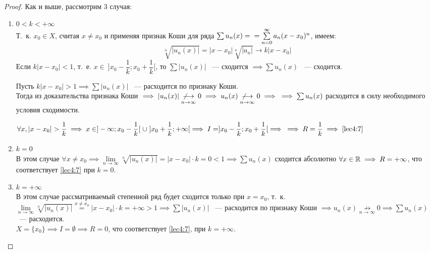 \documentclass[../../main.tex]{subfiles}
\begin{document}
\begin{proof}
	Как и выше, рассмотрим 3 случая:
	\begin{enumerate}
		\item $0 < k < +\infty$ \\
		Т.~к. $x_0 \in X$, считая $x \ne x_0$ и применяя признак Коши
		для ряда $\sum u_n(x) = \\ = \sum\limits_{n = 0}^{\infty} 
		a_n(x - x_0)^n$, имеем:
		\[ \sqrt[n]{ |u_n(x)| } = |x - x_0| \sqrt[n]{|a_n|} 
		\longrightarrow k|x - x_0|
		  \]
		 Если $k|x - x_0| < 1$, т.~е. 
		 $x \in \: ] x_0 - \dfrac{1}{k}; x_0 + \dfrac{1}{k} [$, то
		 $\sum |u_n(x)| $ ~--- сходится $\implies \sum u_n(x)$ ~--- сходится.
		 
		 Пусть $k|x - x_0| > 1 \implies \sum |u_n(x)|$ ~--- расходится
		 по признаку Коши. \\
		 Тогда из доказательства признака Коши $\implies |u_n(x)| 
		 \underset{n \to \infty}{\not \longrightarrow} 0 \implies u_n(x)
		 \underset{n \to \infty}{\not \longrightarrow} 0 \implies 
		 \\ \implies \sum u_n(x) $
		 расходится в силу необходимого условия сходимости.
		 
		 $\forall x, |x - x_0| > \dfrac{1}{k} \implies 
		 x \in ]-\infty; x_0 - \dfrac{1}{k} [ \;
		 \cup \; ] x_0 + \dfrac{1}{k}; +\infty[ 
		 \implies I = ]x_0 - \dfrac{1}{k}; x_0 + \dfrac{1}{k} [ 
		 \implies \\ \implies R = \dfrac{1}{k} \implies \eqref{lec4:7}$
		 
		 \item $k = 0$ \\
		 В этом случае $\forall x \ne x_0 \implies 
		 \underset{n \to \infty}{\lim} \sqrt[n]{|u_n(x)|} =
		 |x - x_0| \cdot k = 0 < 1 \implies \sum u_n(x)$ 
		 сходится абсолютно 
		 $\forall x \in \mathbb{R} \implies R = +\infty$, что соответствует 
		 \eqref{lec4:7} при $k = 0$.
		 
		 \item $k = +\infty$ \\
		 В этом случае рассматриваемый степенной ряд будет сходится
		 только при $x = x_0$, т.~к. $\underset{n \to \infty}{\lim}
		 \sqrt[n]{|u_n(x)|} \overset{x \ne x_0} = |x - x_0| \cdot k =
		 +\infty > 1 \implies \sum |u_n(x)| $ ~--- расходится по 
		 признаку Коши
		 $\implies u_n(x) \underset{n \to \infty}{\not \longrightarrow} 0 
		 \implies \sum u_n(x)$ ~--- расходится. \\
		 $X = \{ x_0 \} \implies I = \emptyset \implies R = 0$,
		 что соответствует \eqref{lec4:7}, при $k = +\infty$.
	\end{enumerate}
\end{proof}
\end{document}
